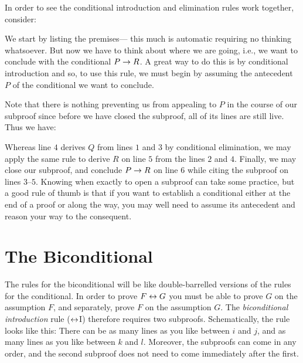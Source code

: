 In order to see the conditional introduction and elimination rules work together, consider:
\begin{earg}
\end{earg}
We start by listing the premises--- this much is automatic requiring no thinking whatsoever.
But now we have to think about where we are going, i.e., we want to conclude with the conditional $P\rightarrow R$.
A great way to do this is by conditional introduction and so, to use this rule, we must begin by assuming the antecedent $P$ of the conditional we want to conclude.
\begin{fitchproof}
	 \pr{}
	 \pr{}
	\open
		 
	\close
\end{fitchproof}
Note that there is nothing preventing us from appealing to $P$ in the course of our subproof since before we have closed the subproof, all of its lines are still live.
Thus we have:
\label{HSproof}
\begin{fitchproof}
	 \pr{}
	 \pr{}
	\open
		 
	\close
\end{fitchproof}
Whereas line $4$ derives $Q$ from lines $1$ and $3$ by conditional elimination, we may apply the same rule to derive $R$ on line $5$ from the lines $2$ and $4$.
Finally, we may close our subproof, and conclude $P \rightarrow R$ on line $6$ while citing the subproof on lines $3$--$5$. 
Knowing when exactly to open a subproof can take some practice, but a good rule of thumb is that if you want to establish a conditional either at the end of a proof or along the way, you may well need to assume its antecedent and reason your way to the consequent.






\section{The Biconditional}

The rules for the biconditional will be like double-barrelled versions of the rules for the conditional.
In order to prove $F \leftrightarrow G$  you must be able to prove $G$ on the assumption $F$, and separately, prove $F$ on the assumption $G$.
The \textit{biconditional introduction} rule ($\leftrightarrow$I) therefore requires two subproofs.
Schematically, the rule looks like this: 
There can be as many lines as you like between $i$ and $j$, and as many lines as you like between $k$ and $l$.
Moreover, the subproofs can come in any order, and the second subproof does not need to come immediately after the first.


